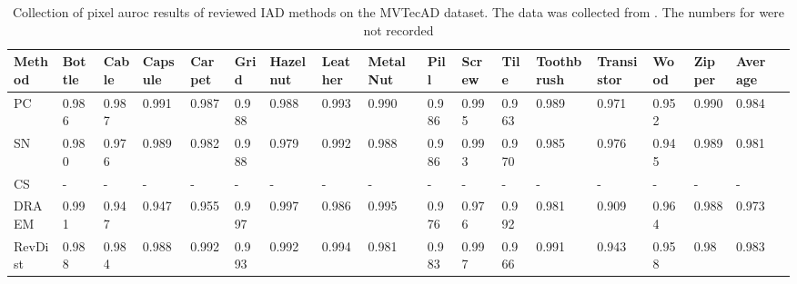 \begin{table}[htbp]
    \tiny
    \centering
    \begin{tabularx}{\textwidth}{|X|X|X|X|X|X|X|X|X|X|X|X|X|X|X|X|X|X|}%
        \hline
        \textbf{Method} & \textbf{Bottle} & \textbf{Cable} & \textbf{Capsule} & \textbf{Carpet} & \textbf{Grid} & \textbf{Hazelnut} & \textbf{Leather} & \textbf{Metal Nut} & \textbf{Pill} & \textbf{Screw} & \textbf{Tile} & \textbf{Toothbrush} & \textbf{Transistor} & \textbf{Wood} & \textbf{Zipper} & \textbf{Average} \\
        \hline
        PC \cite{patchCore2022} & 0.986 & 0.987 & 0.991 & 0.987 & 0.988 & 0.988 & 0.993 & 0.990 & 0.986 & 0.995 & 0.963 & 0.989 & 0.971 & 0.952 & 0.990 & 0.984 \\
        \hline
        SN \cite{liu2023simplenet} & 0.980 & 0.976 & 0.989 & 0.982 & 0.988 & 0.979 & 0.992 & 0.988 & 0.986 & 0.993 & 0.970 & 0.985 & 0.976 & 0.945 & 0.989 & 0.981 \\
        \hline
        CS \cite{csflow2022} & - & - & - & - & - & - & - & - & - & - & - & - & - & - & - & - \\
        \hline
        DRAEM \cite{Zavrtanik_2021DRAEM} & 0.991 & 0.947 & 0.947 & 0.955 & 0.997 & 0.997 & 0.986 & 0.995 & 0.976 & 0.976 & 0.992 & 0.981 & 0.909 & 0.964 & 0.988 & 0.973 \\
        \hline
        RevDist \cite{revdist2023} & 0.988 & 0.984 & 0.988 & 0.992 & 0.993 & 0.992 & 0.994 & 0.981 & 0.983 & 0.997 & 0.966 & 0.991 & 0.943 & 0.958 & 0.98 & 0.983 \\
        \hline
    \end{tabularx}
    \caption{Collection of pixel auroc results of reviewed IAD methods on the MVTecAD \cite{MVTEC_Bergmann_2021} dataset. The data was collected from \cite{liu2024deep} \cite{liu2023simplenet} \cite{Zavrtanik_2021DRAEM} \cite{revdist2023}. The numbers for \cite{csflow2022} were not recorded}
    \label{tab:pixelaurocmvtec}
\end{table}






